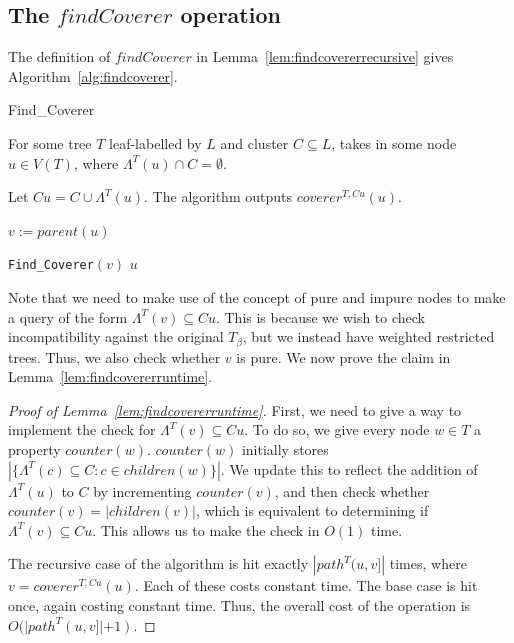\documentclass{article}
\newcommand{\leafset}{\Lambda}
\newcommand{\TB}{T_\beta}
\begin{document}
    \subsection{The $findCoverer$ operation}
    \label{subsec:findcoverer}

    The definition of $findCoverer$ in Lemma~\ref{lem:findcovererrecursive} gives Algorithm~\ref{alg:findcoverer}.

    \begin{algorithm}
        \caption{Find\_Coverer}
        \label{alg:findcoverer}

        \begin{algorithmic}[1]
            \Input For some tree $T$ leaf-labelled by $L$ and cluster $C \subseteq L$, takes in some node $u \in V(T)$, where $\leafset^{T}(u) \cap C = \emptyset$.

            \Output Let $Cu = C \cup \leafset^{T}(u)$. The algorithm outputs $coverer^{T, Cu}(u)$.

            \State $v := parent(u)$

            \If{$\leafset^{T}(v) \subseteq Cu$ and $v$ is pure}
                \State \Return \texttt{Find\_Coverer}$(v)$
            \Else
                \State \Return $u$
            \EndIf
        \end{algorithmic}
    \end{algorithm}

    Note that we need to make use of the concept of pure and impure nodes to make a query of the form $\leafset^{T}(v) \subseteq Cu$. This is because we wish to check incompatibility against the original $\TB$, but we instead have weighted restricted trees. Thus, we also check whether $v$ is pure. We now prove the claim in Lemma~\ref{lem:findcovererruntime}.

    \begin{proof}[Proof of Lemma~\ref{lem:findcovererruntime}]
        First, we need to give a way to implement the check for $\leafset^{T}(v) \subseteq Cu$. To do so, we give every node $w \in T$ a property $counter(w)$. $counter(w)$ initially stores $|\{\leafset^{T}(c) \subseteq C : c \in children(w)\}|$. We update this to reflect the addition of $\leafset^{T}(u)$ to $C$ by incrementing $counter(v)$, and then check whether $counter(v) = |children(v)|$, which is equivalent to determining if $\leafset^{T}(v) \subseteq Cu$. This allows us to make the check in $O(1)$ time.

        The recursive case of the algorithm is hit exactly $|path^{T}(u, v]|$ times, where $v = coverer^{T, Cu}(u)$. Each of these costs constant time. The base case is hit once, again costing constant time. Thus, the overall cost of the operation is $O(|path^{T}(u, v]| + 1)$.
    \end{proof}
\end{document}
